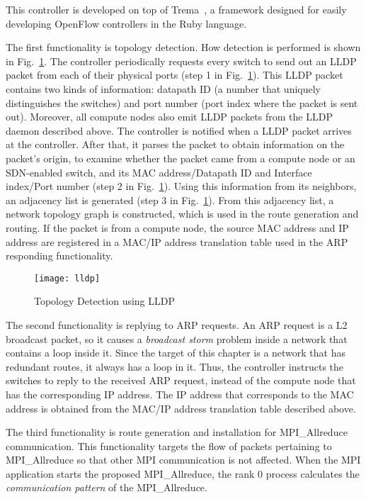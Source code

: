 This controller is developed on top  of Trema~\autocite{trema}, a framework
designed for easily developing OpenFlow controllers in the Ruby language.

The first functionality is topology detection. How detection is
performed is shown in Fig.~\ref{fig:lldp}. The controller periodically
requests every switch to send out an LLDP packet from each of their physical
ports (step 1 in Fig.~\ref{fig:lldp}). This LLDP packet contains two kinds of
information: datapath ID (a number that uniquely distinguishes the switches)
and port number (port index where the packet is sent out). Moreover, all
compute nodes also emit LLDP packets from the LLDP daemon described above.
The controller is notified when a LLDP packet arrives at the controller. After
that, it parses the packet to obtain information on the packet's origin, to
examine whether the packet came from a compute node or an SDN-enabled
switch, and its MAC address/Datapath ID and Interface index/Port number (step
2 in Fig.~\ref{fig:lldp}). Using this information from its neighbors, an
adjacency list is generated (step 3 in Fig.~\ref{fig:lldp}). From this
adjacency list, a network topology graph is constructed, which is used in the
route generation and routing. If the packet is from a compute node, the
source MAC address and IP address are registered in a MAC/IP address
translation table used in the ARP responding functionality.

\begin{figure}
    \centering
    \texttt{[image: lldp]}
    \caption{Topology Detection using LLDP}%
    \label{fig:lldp}
\end{figure}

The second functionality is replying to ARP requests. An ARP request is
a L2 broadcast packet, so it causes a \emph{broadcast storm} problem
inside a network that contains a loop inside it. Since the target of
this chapter is a network that has redundant routes, it always has a loop
in it. Thus, the controller instructs the switches to reply to the
received ARP request, instead of the compute node that has the
corresponding IP address. The IP address that corresponds to the MAC
address is obtained from the MAC/IP address translation table described above.

The third functionality is route generation and installation for
MPI\_Allreduce communication. This functionality targets the flow of packets
pertaining to MPI\_Allreduce so that other MPI communication is not affected.
When the MPI application starts the proposed MPI\_Allreduce, the rank 0
process calculates the \emph{communication pattern} of the MPI\_Allreduce.

